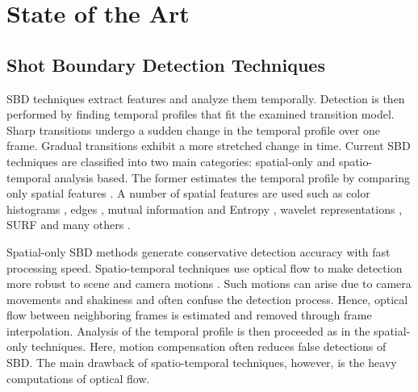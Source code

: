 \documentclass[journal]{IEEEtran}
\begin{document}
\section{State of the Art}







\subsection{Shot Boundary Detection Techniques}

SBD techniques \cite{Smeaton10,Priya14,Lu13,Liu07} extract features and analyze them temporally. Detection is then performed by finding temporal profiles that fit the examined transition model. Sharp transitions undergo a sudden change in the temporal profile over one frame. Gradual transitions exhibit a more stretched change in time. Current SBD techniques are classified into two main categories: spatial-only and spatio-temporal analysis based. The former estimates the temporal profile by comparing only spatial features \cite{Priya14,Lu13,Smeaton10,Mohanta12,Adjeroh09,Cernekova06,Lankinen13,Lelescu03,Zhang12,Thounaojam16}. A number of spatial features are used such as color histograms \cite{Lu13,Zhang12}, edges \cite{Adjeroh09}, mutual information and Entropy \cite{Cernekova06}, wavelet representations \cite{Priya14}, SURF \cite{Apostolidis14} and many others \cite{Thounaojam16,Lelescu03,Lankinen13,Berladi15}. 

Spatial-only SBD methods generate conservative detection accuracy with fast processing speed. Spatio-temporal techniques use optical flow to make detection more robust to scene and camera motions \cite{Priya14,Mohanta12,Lian11,Kawai07,Kawai07}. Such motions can arise due to camera movements and shakiness and often confuse the detection process. Hence, optical flow \cite{Tao12,Dosovitskiy15,Baker11} between neighboring frames is estimated and removed through frame interpolation. Analysis of the temporal profile is then proceeded as in the spatial-only techniques. Here, motion compensation often reduces false detections of SBD. The main drawback of spatio-temporal techniques, however, is the heavy computations of optical flow.     
\end{document}
